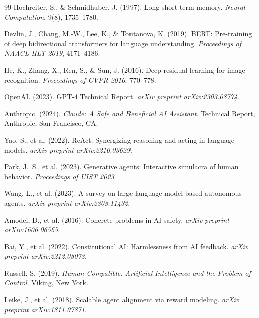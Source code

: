 \documentclass[12pt,a4paper]{article}
\begin{document}
\begin{thebibliography}{99}
Hochreiter, S., \& Schmidhuber, J. (1997).
Long short-term memory.
\textit{Neural Computation}, 9(8), 1735--1780.

Devlin, J., Chang, M.-W., Lee, K., \& Toutanova, K. (2019).
BERT: Pre-training of deep bidirectional transformers for language
understanding.
\textit{Proceedings of NAACL-HLT 2019}, 4171--4186.

He, K., Zhang, X., Ren, S., \& Sun, J. (2016).
Deep residual learning for image recognition.
\textit{Proceedings of CVPR 2016}, 770--778.


OpenAI. (2023).
GPT-4 Technical Report.
\textit{arXiv preprint arXiv:2303.08774}.

Anthropic. (2024).
\textit{Claude: A Safe and Beneficial AI Assistant}.
Technical Report, Anthropic, San Francisco, CA.

Yao, S., et al. (2022).
ReAct: Synergizing reasoning and acting in language models.
\textit{arXiv preprint arXiv:2210.03629}.

Park, J.~S., et al. (2023).
Generative agents: Interactive simulacra of human behavior.
\textit{Proceedings of UIST 2023}.

Wang, L., et al. (2023).
A survey on large language model based autonomous agents.
\textit{arXiv preprint arXiv:2308.11432}.


Amodei, D., et al. (2016).
Concrete problems in AI safety.
\textit{arXiv preprint arXiv:1606.06565}.

Bai, Y., et al. (2022).
Constitutional AI: Harmlessness from AI feedback.
\textit{arXiv preprint arXiv:2212.08073}.

Russell, S. (2019).
\textit{Human Compatible: Artificial Intelligence and the Problem of Control}.
Viking, New York.

Leike, J., et al. (2018).
Scalable agent alignment via reward modeling.
\textit{arXiv preprint arXiv:1811.07871}.



\end{thebibliography}
\end{document}
